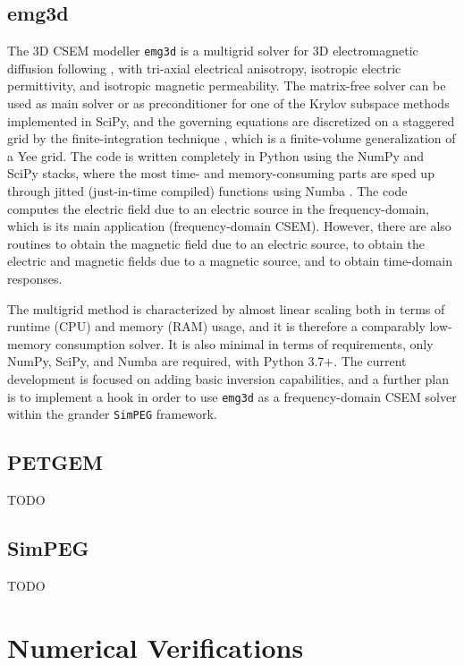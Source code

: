 \documentclass[
    paper,
  ]{geophysics}
\newcommand{\emg}[2]{\texttt{emg#1#2}\xspace}
\newcommand{\simpeg}{\texttt{SimPEG}\xspace}
\begin{document}
\subsection{emg3d}

The 3D CSEM modeller \emg3d is a multigrid \citep{CMMP.64.Fedorenko} solver for
3D electromagnetic diffusion following \cite{GP.06.Mulder}, with tri-axial
electrical anisotropy, isotropic electric permittivity, and isotropic magnetic
permeability. The matrix-free solver can be used as main solver or as
preconditioner for one of the Krylov subspace methods implemented in SciPy, and
the governing equations are discretized on a staggered grid by the
finite-integration technique \citep{AEU.77.Weiland}, which is a finite-volume
generalization of a Yee grid. The code is written completely in Python using
the NumPy and SciPy stacks, where the most time- and memory-consuming parts are
sped up through jitted (just-in-time compiled) functions using Numba
\citep{LLVM.15.Lam}. The code computes the electric field due to an electric
source in the frequency-domain, which is its main application (frequency-domain
CSEM). However, there are also routines to obtain the magnetic field due to an
electric source, to obtain the electric and magnetic fields due to a magnetic
source, and to obtain time-domain responses.

The multigrid method is characterized by almost linear scaling both in terms of
runtime (CPU) and memory (RAM) usage, and it is therefore a comparably
low-memory consumption solver. It is also minimal in terms of requirements,
only NumPy, SciPy, and Numba are required, with Python 3.7+. The current
development is focused on adding basic inversion capabilities, and a further
plan is to implement a hook in order to use \emg3d as a frequency-domain CSEM
solver within the grander \simpeg framework.

\subsection{PETGEM}

TODO


\subsection{SimPEG}

TODO


\clearpage  %
\section{Numerical Verifications}
\end{document}
